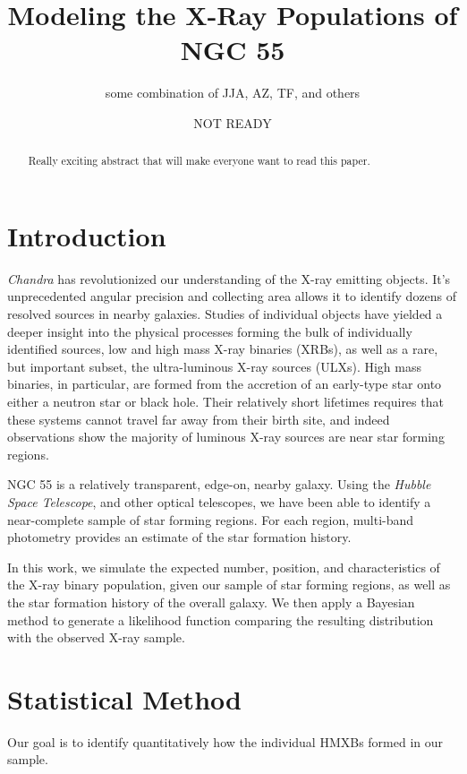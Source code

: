 \documentclass[12pt, preprint]{aastex}
\begin{document}
\title{Modeling the X-Ray Populations of NGC 55}
\author{some combination of JJA, AZ, TF, and others}
\date{NOT READY}

\begin{abstract}
Really exciting abstract that will make everyone want to read this paper.
\end{abstract}

\section{Introduction}

{\it Chandra} has revolutionized our understanding of the X-ray emitting objects. It's unprecedented angular precision and collecting area allows it to identify dozens of resolved sources in nearby galaxies. Studies of individual objects have yielded a deeper insight into the physical processes forming the bulk of individually identified sources, low and high mass X-ray binaries (XRBs), as well as a rare, but important subset, the ultra-luminous X-ray sources (ULXs). High mass binaries, in particular, are formed from the accretion of an early-type star onto either a neutron star or black hole. Their relatively short lifetimes requires that these systems cannot travel far away from their birth site, and indeed observations show the majority of luminous X-ray sources are near star forming regions. 

NGC 55 is a relatively transparent, edge-on, nearby galaxy. Using the {\it Hubble Space Telescope}, and other optical telescopes, we have been able to identify a near-complete sample of star forming regions. For each region, multi-band photometry provides an estimate of the star formation history. 

In this work, we simulate the expected number, position, and characteristics of the X-ray binary population, given our sample of star forming regions, as well as the star formation history of the overall galaxy. We then apply a Bayesian method to generate a likelihood function comparing the resulting distribution with the observed X-ray sample.



\section{Statistical Method}

Our goal is to identify quantitatively how the individual HMXBs formed in our sample. 
\end{document}
